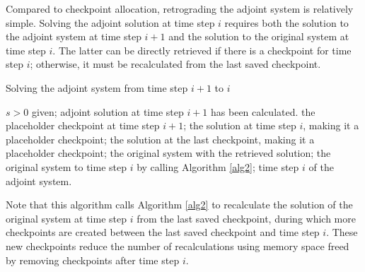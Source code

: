 \documentclass[oneeqnum, onethmnum, onefignum, onetabnum]{siamltex}
\begin{document}
Compared to checkpoint allocation, retrograding the adjoint system is
relatively simple.  Solving the adjoint solution at time step $i$ requires both
the solution to the adjoint system at time step $i + 1$ and the solution to the
original system at time step $i$.  The latter can be directly retrieved if
there is a checkpoint for time step $i$; otherwise, it must be recalculated
from the last saved checkpoint.
\begin{algorithm}
\caption{Solving the adjoint system from time step $i + 1$ to $i$}
\label{alg3}
\begin{algorithmic}[indent=3em]
    \REQUIRE $s > 0$ given; adjoint solution at time step $i + 1$ has
             been calculated.
     the placeholder checkpoint at time step $i + 1$;
         the solution at time step $i$, making it a 
               placeholder checkpoint;
    \ELSE
         the solution at the last checkpoint, making it
               a placeholder checkpoint;
         the original system with the retrieved solution;
         the original system to time step $i$ by calling
               Algorithm \ref{alg2};
    \ENDIF
     time step $i$ of the adjoint system.
\end{algorithmic}
\end{algorithm}
Note that this algorithm calls Algorithm \ref{alg2} to recalculate the
solution of the original system at time step $i$ from the last saved checkpoint,
during which more checkpoints are created between the last saved checkpoint
and time step $i$.  These new checkpoints reduce the number of recalculations
using memory space freed by removing checkpoints after time step $i$.
\end{document}
